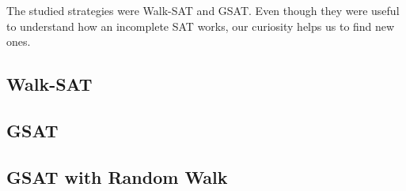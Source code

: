 
The studied strategies were Walk-SAT and GSAT. Even though they were useful to understand how an incomplete SAT works, our curiosity helps us to find new ones.
\subsection{Walk-SAT}
\subsection{GSAT}
\subsection{GSAT with Random Walk}

